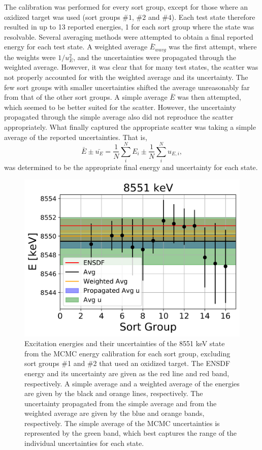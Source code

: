 The calibration was performed for every sort group, except for those where an oxidized target was used (sort groups $\#1$, $\#2$ and $\#4$). Each test state therefore resulted in up to 13 reported energies, 1 for each sort group where the state was resolvable. Several averaging methods were attempted to obtain a final reported energy for each test state. A weighted average $\bar{E}_{wavg}$ was the first attempt, where the weights were $1/u_{E}^{2}$, and the uncertainties were propagated through the weighted average. However, it was clear that for many test states, the scatter was not properly accounted for with the weighted average and its uncertainty. The few sort groups with smaller uncertainties shifted the average unreasonably far from that of the other sort groups. A simple average $\bar{E}$ was then attempted, which seemed to be better suited for the scatter. However, the uncertainty propagated through the simple average also did not reproduce the scatter appropriately. What finally captured the appropriate scatter was taking a simple average of the reported uncertainties. That is,
\begin{equation} \label{eqn:simple_avg}
\bar{E} \pm \bar{u_{E}} = \frac{1}{N}\sum_{i}^{N}{E_{i}} \pm \frac{1}{N}\sum_{i}^{N}{u_{E, i}},
\end{equation}
was determined to be the appropriate final energy and uncertainty for each state.

\begin{figure}[!p]
\centering
\includegraphics[width=6.5in]{Chapter-6/figs/8551keV_comparison.png}
\caption{\label{fig:8551keV_comparison}Excitation energies and their uncertainties of the 8551 keV state from the MCMC energy calibration for each sort group, excluding sort groups $\#$1 and $\#$2 that used an oxidized target. The ENSDF energy and its uncertainty are given as the red line and red band, respectively. A simple average and a weighted average of the energies are given by the black and orange lines, respectively. The uncertainty propagated from the simple average and from the weighted average are given by the blue and orange bands, respectively. The simple average of the MCMC uncertainties is represented by the green band, which best captures the range of the individual uncertainties for each state.}
\end{figure}

